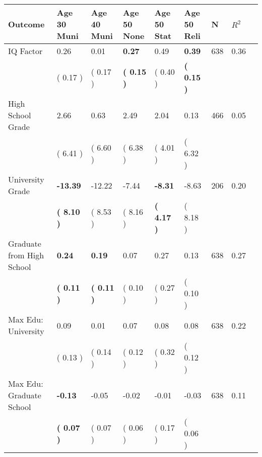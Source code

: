 \begin{tabular}{L{6.2cm} C{1.8cm} C{1.8cm} C{1.8cm} C{1.8cm} C{1.8cm} C{1.8cm} C{0.3cm} C{0.3cm}}
\toprule
 \textbf{Outcome} & \textbf{Age 30 Muni} & \textbf{Age 40 Muni} & \textbf{Age 50 None} & \textbf{Age 50 Stat} & \textbf{Age 50 Reli} & \textbf{N} & \textbf{$ R^2$} \\
\midrule
IQ Factor &      0.26 &      0.01 & \textbf{     0.27} &      0.49 & \textbf{     0.39}  & 638 &       0.36 \\ 
 & (     0.17 ) & (     0.17 ) & \textbf{(     0.15 )} & (     0.40 ) & \textbf{(     0.15 )}  & \\
High School Grade &      2.66 &      0.63 &      2.49 &      2.04 &      0.13  & 466 &       0.05 \\ 
 & (     6.41 ) & (     6.60 ) & (     6.38 ) & (     4.01 ) & (     6.32 )  & \\
University Grade & \textbf{   -13.39} &    -12.22 &     -7.44 & \textbf{    -8.31} &     -8.63  & 206 &       0.20 \\ 
 & \textbf{(     8.10 )} & (     8.53 ) & (     8.16 ) & \textbf{(     4.17 )} & (     8.18 )  & \\
Graduate from High School & \textbf{     0.24} & \textbf{     0.19} &      0.07 &      0.27 &      0.13  & 638 &       0.27 \\ 
 & \textbf{(     0.11 )} & \textbf{(     0.11 )} & (     0.10 ) & (     0.27 ) & (     0.10 )  & \\
Max Edu: University &      0.09 &      0.01 &      0.07 &      0.08 &      0.08  & 638 &       0.22 \\ 
 & (     0.13 ) & (     0.14 ) & (     0.12 ) & (     0.32 ) & (     0.12 )  & \\
Max Edu: Graduate School & \textbf{    -0.13} &     -0.05 &     -0.02 &     -0.01 &     -0.03  & 638 &       0.11 \\ 
 & \textbf{(     0.07 )} & (     0.07 ) & (     0.06 ) & (     0.17 ) & (     0.06 )  & \\
\bottomrule
\end{tabular}
